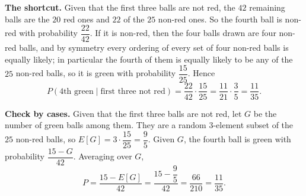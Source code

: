 \textbf{The shortcut.} Given that the first three balls are not red, the $42$ remaining balls are the $20$ red ones and $22$ of the $25$ non-red ones. So the fourth ball is non-red with probability $\dfrac{22}{42}$. If it is non-red, then the four balls drawn are four non-red balls, and by symmetry every ordering of every set of four non-red balls is equally likely; in particular the fourth of them is equally likely to be any of the $25$ non-red balls, so it is green with probability $\dfrac{15}{25}$. Hence
\[P(\text{4th green}\mid\text{first three not red})=\dfrac{22}{42}\cdot\dfrac{15}{25}=\dfrac{11}{21}\cdot\dfrac{3}{5}=\boxed{\dfrac{11}{35}}.\]

\textbf{Check by cases.} Given that the first three balls are not red, let $G$ be the number of green balls among them. They are a random $3$-element subset of the $25$ non-red balls, so $E[G]=3\cdot\dfrac{15}{25}=\dfrac{9}{5}$. Given $G$, the fourth ball is green with probability $\dfrac{15-G}{42}$. Averaging over $G$,
\[P=\dfrac{15-E[G]}{42}=\dfrac{15-\dfrac{9}{5}}{42}=\dfrac{66}{210}=\dfrac{11}{35}.\]
